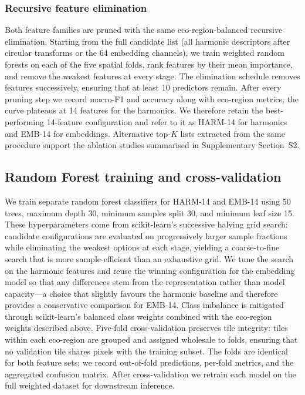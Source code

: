 \documentclass[utf8]{FrontiersinHarvard}
\begin{document}
\subsubsection{Recursive feature elimination}
\label{subsubsec:rfe}
Both feature families are pruned with the same eco-region-balanced recursive elimination. Starting from the full candidate list (all harmonic descriptors after circular transforms or the 64 embedding channels), we train weighted random forests on each of the five spatial folds, rank features by their mean importance, and remove the weakest features at every stage. The elimination schedule removes features successively, ensuring that at least 10 predictors remain. After every pruning step we record macro-F1 and accuracy along with eco-region metrics; the curve plateaus at 14 features for the harmonics. We therefore retain the best-performing 14-feature configuration and refer to it as HARM-14 for harmonics and EMB-14 for embeddings. Alternative top-$K$ lists extracted from the same procedure support the ablation studies summarised in Supplementary Section~S2.

\subsection{Random Forest training and cross-validation}
We train separate random forest classifiers for HARM-14 and EMB-14 using 50 trees, maximum depth 30, minimum samples split 30, and minimum leaf size 15. These hyperparameters come from scikit-learn’s successive halving grid search: candidate configurations are evaluated on progressively larger sample fractions while eliminating the weakest options at each stage, yielding a coarse-to-fine search that is more sample-efficient than an exhaustive grid. We tune the search on the harmonic features and reuse the winning configuration for the embedding model so that any differences stem from the representation rather than model capacity—a choice that slightly favours the harmonic baseline and therefore provides a conservative comparison for EMB-14. Class imbalance is mitigated through scikit-learn’s balanced class weights combined with the eco-region weights described above. Five-fold cross-validation preserves tile integrity: tiles within each eco-region are grouped and assigned wholesale to folds, ensuring that no validation tile shares pixels with the training subset. The folds are identical for both feature sets; we record out-of-fold predictions, per-fold metrics, and the aggregated confusion matrix. After cross-validation we retrain each model on the full weighted dataset for downstream inference.
\end{document}
